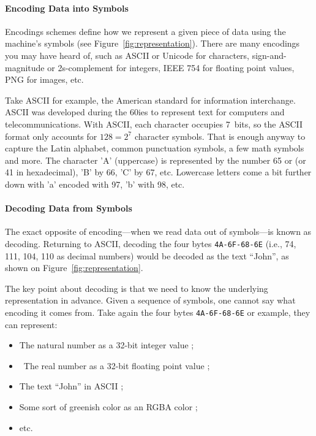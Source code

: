 \documentclass{aldast}
\begin{document}
\paragraph{Encoding Data into Symbols}

Encodings schemes define how we represent a given piece of data using
the machine's symbols (see Figure~\ref{fig:representation}). There are
many encodings you may have heard of, such as ASCII or Unicode for
characters, sign-and-magnitude or 2s-complement for integers, IEEE 754
for floating point values, PNG for images, etc.

Take ASCII for example, the American standard for information
interchange. ASCII was developed during the 60ies to represent text
for computers and telecommunications. With ASCII, each character
occupies 7~bits, so the ASCII format only accounts for $128=2^7$
character symbols. That is enough anyway to capture the Latin
alphabet, common punctuation symbols, a few math symbols and more. The
character 'A' (uppercase) is represented by the number 65 or (or 41 in
hexadecimal), 'B' by 66, 'C' by 67, etc. Lowercase letters come a bit
further down with 'a' encoded with 97, 'b' with 98, etc.

\paragraph{Decoding Data from Symbols}

The exact opposite of encoding---when we read data out of symbols---is
known as decoding. Returning to ASCII, decoding the four bytes
\texttt{4A-6F-68-6E} (i.e., 74, 111, 104, 110 as decimal numbers)
would be decoded as the text ``John'', as shown on
Figure~\ref{fig:representation}.

The key point about decoding is that we need to know the underlying
representation in advance. Given a sequence of symbols, one cannot say what
encoding it comes from. Take again the four bytes \texttt{4A-6F-68-6E} or
example, they can represent:

\begin{itemize}
\item The natural number  as a 32-bit integer value ;
\item The real number  as a 32-bit floating point value ;
\item The text ``John'' in ASCII ;
\item Some sort of \textcolor{testColor}{greenish color} as an RGBA color ;
\item etc.
\end{itemize}
\end{document}
